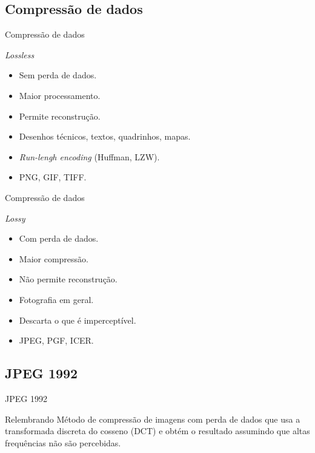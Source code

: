 \documentclass{beamer}
\begin{document}
\subsection{Compressão de dados}
\begin{frame}{Compressão de dados}
   \begin{block}{\textit{Lossless}}
      \begin{itemize}
         \item Sem perda de dados.
         \item Maior processamento.
         \item Permite reconstrução.
         \item Desenhos técnicos, textos, quadrinhos, mapas.
         \item \emph{Run-lengh encoding} (Huffman, LZW).
         \item PNG, GIF, TIFF.
      \end{itemize}
   \end{block}
\end{frame}
\begin{frame}{Compressão de dados}
   \begin{block}{\textit{Lossy}}
      \begin{itemize}
         \item Com perda de dados.
         \item Maior compressão.
         \item Não permite reconstrução.
         \item Fotografia em geral.
         \item Descarta o que é imperceptível.
         \item JPEG, PGF, ICER.
      \end{itemize}
   \end{block}
\end{frame}
\subsection{JPEG 1992}
\begin{frame}{JPEG 1992}
   \begin{block}{Relembrando}
      Método de compressão de imagens com perda de dados que usa a transformada discreta do cosseno (DCT) e obtém o resultado assumindo que altas frequências não são percebidas.
   \end{block}
\end{frame}
\end{document}
